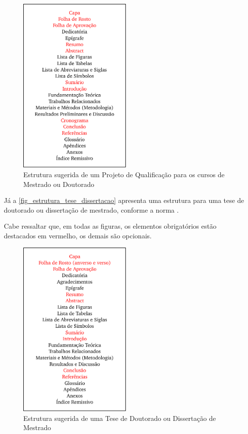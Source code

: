 \begin{apendicesenv}
    \begin{figure}[!htb]
        \centering
        \caption{Estrutura sugerida de um Projeto de Qualificação para os cursos de Mestrado ou Doutorado}
        \label{fig_estrutura_projeto_qualificacao}
        \includegraphics[width=0.5\textwidth]{figuras/estrutura-projeto-qualificacao}
    \end{figure}

    Já a \autoref{fig_estrutura_tese_dissertacao} apresenta uma estrutura para uma tese de doutorado ou dissertação de mestrado, conforme a norma .

    Cabe ressaltar que, em todas as figuras, os elementos obrigatórios estão destacados em vermelho, os demais são opcionais.

    \begin{figure}[!htb]
        \centering
        \caption{Estrutura sugerida de uma Tese de Doutorado ou Dissertação de Mestrado}
        \label{fig_estrutura_tese_dissertacao}
        \includegraphics[width=0.5\textwidth]{figuras/estrutura-tese-dissertacao}
    \end{figure}


\end{apendicesenv}
